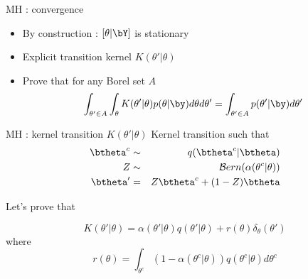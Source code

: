 \begin{frame}{MH : convergence} 
 \begin{itemize}
  \item By construction : $[\theta | \bY]$ is stationary 
  \item Explicit transition kernel
   $K(\theta' | \theta)$
  \item Prove that for any Borel set $A$
  $$ \int_{\theta' \in A} \int_\theta K(\theta'|\theta) p(\theta  | \by)  d\theta  d \theta' = \int_{\theta' \in A}p(\theta' | \by) d \theta'$$
 \end{itemize}
\end{frame}
\begin{frame}{MH : kernel transition $K(\theta' | \theta)$} 
Kernel transition such that
\begin{eqnarray*}
  \btheta^c &\sim& q(\btheta^c | \btheta)\\
  Z &\sim& \mathcal{B}ern(\alpha(\theta^c | \theta))\\
 \btheta' &=& Z \btheta^c    + (1-Z)  \btheta
 \end{eqnarray*}
 
Let's prove that  
  \begin{block}{}
$$K(\theta' | \theta) =   \alpha(\theta' | \theta) q(\theta'|\theta)  + r(\theta) \delta_{\theta}(\theta')$$
where
$$r(\theta) = \int_{\theta^c} (1-\alpha(\theta^c | \theta)) q (\theta^c | \theta) d \theta^c$$
\end{block}

 
\end{frame}

